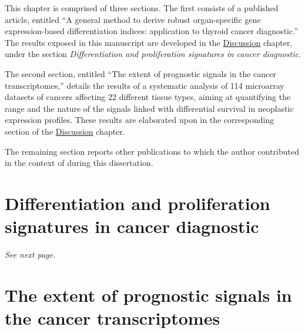 This chapter is comprised of three sections.  The first consists of a published
article, entitled ``A general method to derive robust organ-specific gene
expression-based differentiation indices: application to thyroid cancer
diagnostic.''\cite{tomas_general_2012} The results exposed in this manuscript
are developed in the
\hyperref[discussion-differentiation-microarrays]{\textsf{Discussion}} chapter,
under the section \emph{Differentiation and proliferation signatures in cancer
  diagnostic}.

The second section, entitled ``The extent of prognostic signals in the cancer
transcriptomes,'' details the results of a systematic analysis of 114 microarray
datasets of cancers affecting 22 different tissue types, aiming at quantifying
the range and the nature of the signals linked with differential survival in
neoplastic expression profiles.  These results are elaborated upon in the
corresponding section of the
\hyperref[sec:discussion-prognostic-microarrays]{\textsf{Discussion}} chapter.

The remaining section reports other publications to which the author contributed
in the context of during this dissertation.



\section{Differentiation and proliferation signatures in cancer diagnostic}
\label{sec:results-differentiation-proliferation}

\emph{See next page.}

% 


\section{The extent of prognostic signals in the cancer transcriptomes}
\label{sec:results-prognostic-survival}

